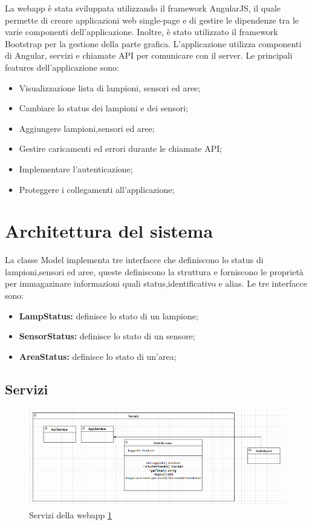 La webapp è stata sviluppata utilizzando il framework AngularJS, il quale permette di creare applicazioni web single-page e di gestire le dipendenze tra le varie componenti dell'applicazione. Inoltre, è stato utilizzato il framework Bootstrap per la gestione della parte grafica. L'applicazione utilizza componenti di Angular, servizi e chiamate API per comunicare con il server. Le principali features dell'applicazione sono:
\begin{itemize}
    \item Visualizzazione lista di lampioni, sensori ed aree;
    \item Cambiare lo status dei lampioni e dei sensori;
    \item Aggiungere lampioni,sensori ed aree;
    \item Gestire caricamenti ed errori durante le chiamate API;
    \item Implementare l'autenticazione;
    \item Proteggere i collegamenti all'applicazione; 
\end{itemize} 

\section{Architettura del sistema}

La classe Model implementa tre interfacce che definiscono lo status di lampioni,sensori ed aree, queste definiscono la struttura e forniscono le proprietà per immagazinare informazioni quali status,identificativo e alias. Le tre interfacce sono:
\begin{itemize}
    \item \textbf{LampStatus:} definisce lo stato di un lampione;
    \item \textbf{SensorStatus:} definisce lo stato di un sensore;
    \item \textbf{AreaStatus:} definisce lo stato di un'area;
\end{itemize}

\subsection{Servizi}

\begin{figure}[h]
    \centering
    \includegraphics[width=\textwidth]{img/services_webapp.png}
    \caption{Servizi della webapp \ref{fig:services_webapp}}
    \label{fig:services_webapp}
\end{figure}

